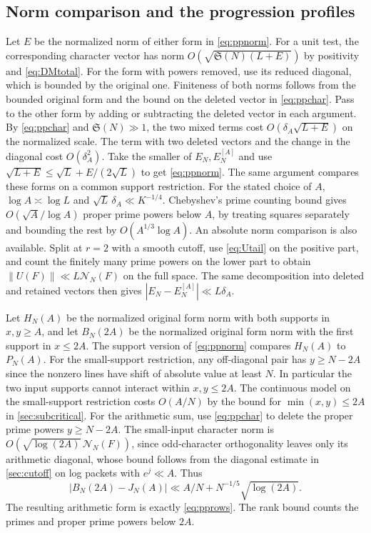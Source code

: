 \documentclass[11pt,a4paper]{article}
\numberwithin{equation}{section}
\newcommand{\SSS}{\mathfrak S}
\newcommand{\NN}{\mathcal N_N}
\begin{document}
\subsection{Norm comparison and the progression profiles}

Let $E$ be the normalized norm of either form in
\cref{eq:ppnorm}. For a unit test, the corresponding character
vector has norm $O(\sqrt{\SSS(N)(L+E)})$ by positivity and
\cref{eq:DMtotal}. For the form with powers removed, use its
reduced diagonal, which is bounded by the original one.
Finiteness of both norms follows from the bounded original form
and the bound on the deleted vector in \cref{eq:ppchar}.
Pass to the other form by adding or subtracting the deleted
vector in each argument. By \cref{eq:ppchar} and $\SSS(N)\gg1$,
the two mixed terms cost $O(\delta_A\sqrt{L+E})$ on the
normalized scale. The term with two deleted vectors and the
change in the diagonal cost $O(\delta_A^2)$. Take the smaller
of $E_N,E_N^{[A]}$ and use
$\sqrt{L+E}\le\sqrt L+E/(2\sqrt L)$
to get \cref{eq:ppnorm}. The same argument compares these forms
on a common support restriction. For the stated choice of $A$,
$\log A\asymp\log L$ and
$\sqrt L\,\delta_A\ll K^{-1/4}$.
Chebyshev's prime counting bound gives $O(\sqrt A/\log A)$
proper prime powers below $A$, by treating squares separately
and bounding the rest by $O(A^{1/3}\log A)$.
An absolute norm comparison is also available. Split at $r=2$
with a smooth cutoff, use \cref{eq:Utail} on the positive
part, and count the finitely many prime powers on the lower
part to obtain $\|U(F)\|\ll L\NN(F)$ on the full space.
The same decomposition into deleted and retained vectors
then gives $|E_N-E_N^{[A]}|\ll L\delta_A$.

Let $H_N(A)$ be the normalized original form norm with both
supports in $x,y\ge A$, and let $B_N(2A)$ be the normalized
original form norm with the first support in $x\le2A$.
The support version of \cref{eq:ppnorm} compares $H_N(A)$
to $P_N(A)$. For the small-support restriction, any
off-diagonal pair has $y\ge N-2A$ since the nonzero lines
have shift of absolute value at least $N$. In particular the
two input supports cannot interact within $x,y\le2A$.
The continuous model on the small-support restriction costs
$O(A/N)$ by the bound for $\min(x,y)\le2A$ in
\cref{sec:subcritical}. For the arithmetic sum, use
\cref{eq:ppchar} to delete the proper prime powers $y\ge N-2A$.
The small-input character norm is $O(\sqrt{\log(2A)}\,\NN(F))$,
since odd-character orthogonality leaves only its arithmetic
diagonal, whose bound follows from the diagonal estimate in
\cref{sec:cutoff} on log packets with $e^j\ll A$.
Thus
\begin{equation}
 |B_N(2A)-J_N(A)|\ll A/N+N^{-1/5}\sqrt{\log(2A)} .
 \label{eq:ppboundrows}
\end{equation}
The resulting arithmetic form is exactly \cref{eq:pprows}.
The rank bound counts the primes and proper prime powers
below $2A$.
\end{document}
